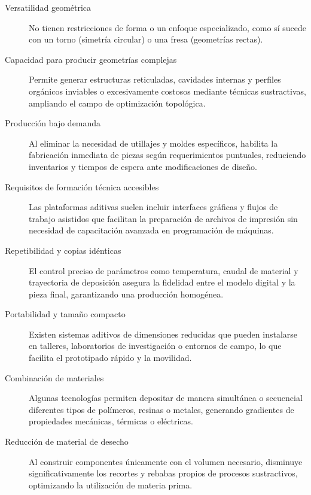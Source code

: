 \begin{description}

\item[Versatilidad geométrica]  
    No tienen restricciones de forma o un enfoque especializado, como sí sucede con un torno (simetría circular) o una fresa (geometrías rectas).

  \item[Capacidad para producir geometrías complejas] 
    Permite generar estructuras reticuladas, cavidades internas y perfiles orgánicos inviables o excesivamente costosos mediante técnicas sustractivas, ampliando el campo de optimización topológica.

  \item[Producción bajo demanda] 
    Al eliminar la necesidad de utillajes y moldes específicos, habilita la fabricación inmediata de piezas según requerimientos puntuales, reduciendo inventarios y tiempos de espera ante modificaciones de diseño.

  \item[Requisitos de formación técnica accesibles] 
    Las plataformas aditivas suelen incluir interfaces gráficas y flujos de trabajo asistidos que facilitan la preparación de archivos de impresión sin necesidad de capacitación avanzada en programación de máquinas.

  \item[Repetibilidad y copias idénticas] 
    El control preciso de parámetros como temperatura, caudal de material y trayectoria de deposición asegura la fidelidad entre el modelo digital y la pieza final, garantizando una producción homogénea.

  \item[Portabilidad y tamaño compacto] 
    Existen sistemas aditivos de dimensiones reducidas que pueden instalarse en talleres, laboratorios de investigación o entornos de campo, lo que facilita el prototipado rápido y la movilidad.

  \item[Combinación de materiales] 
    Algunas tecnologías permiten depositar de manera simultánea o secuencial diferentes tipos de polímeros, resinas o metales, generando gradientes de propiedades mecánicas, térmicas o eléctricas.

  \item[Reducción de material de desecho] 
    Al construir componentes únicamente con el volumen necesario, disminuye significativamente los recortes y rebabas propios de procesos sustractivos, optimizando la utilización de materia prima.
    
\end{description}

